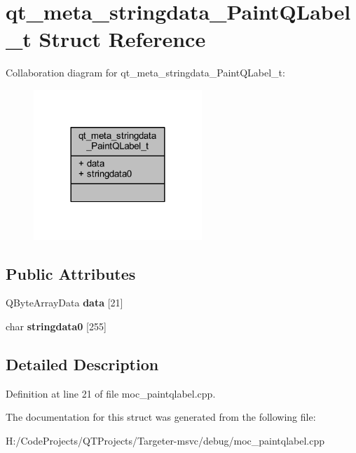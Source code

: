 \hypertarget{structqt__meta__stringdata___paint_q_label__t}{}\section{qt\+\_\+meta\+\_\+stringdata\+\_\+\+Paint\+Q\+Label\+\_\+t Struct Reference}
\label{structqt__meta__stringdata___paint_q_label__t}


Collaboration diagram for qt\+\_\+meta\+\_\+stringdata\+\_\+\+Paint\+Q\+Label\+\_\+t\+:
\nopagebreak
\begin{figure}[H]
\begin{center}
\leavevmode
\includegraphics[width=180pt]{structqt__meta__stringdata___paint_q_label__t__coll__graph}
\end{center}
\end{figure}
\subsection*{Public Attributes}
\begin{DoxyCompactItemize}
\item 
\mbox{\label{structqt__meta__stringdata___paint_q_label__t_aa067bdbf91630b95ac9625b0c0073886}} 
Q\+Byte\+Array\+Data {\bfseries data} \mbox{[}21\mbox{]}
\item 
\mbox{\label{structqt__meta__stringdata___paint_q_label__t_ac84668d6aa6c02b698fa23c3cb9ecee4}} 
char {\bfseries stringdata0} \mbox{[}255\mbox{]}
\end{DoxyCompactItemize}


\subsection{Detailed Description}


Definition at line 21 of file moc\+\_\+paintqlabel.\+cpp.



The documentation for this struct was generated from the following file\+:\begin{DoxyCompactItemize}
\item 
H\+:/\+Code\+Projects/\+Q\+T\+Projects/\+Targeter-\/msvc/debug/moc\+\_\+paintqlabel.\+cpp\end{DoxyCompactItemize}
